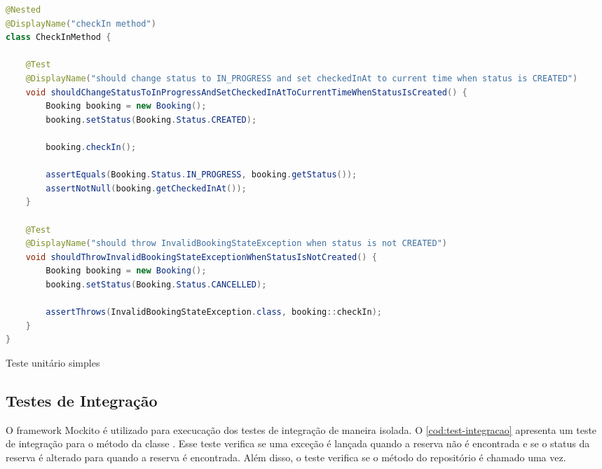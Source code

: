 \begin{codigo}[H]
    \begin{lstlisting}[language=Java]
@Nested
@DisplayName("checkIn method")
class CheckInMethod {

    @Test
    @DisplayName("should change status to IN_PROGRESS and set checkedInAt to current time when status is CREATED")
    void shouldChangeStatusToInProgressAndSetCheckedInAtToCurrentTimeWhenStatusIsCreated() {
        Booking booking = new Booking();
        booking.setStatus(Booking.Status.CREATED);

        booking.checkIn();

        assertEquals(Booking.Status.IN_PROGRESS, booking.getStatus());
        assertNotNull(booking.getCheckedInAt());
    }

    @Test
    @DisplayName("should throw InvalidBookingStateException when status is not CREATED")
    void shouldThrowInvalidBookingStateExceptionWhenStatusIsNotCreated() {
        Booking booking = new Booking();
        booking.setStatus(Booking.Status.CANCELLED);

        assertThrows(InvalidBookingStateException.class, booking::checkIn);
    }
}
    \end{lstlisting}
    \caption{Teste unitário simples}
    \label{cod:unitario-simples}
\end{codigo}

\subsection{Testes de Integração}
O framework Mockito é utilizado para execucação dos testes de integração de maneira isolada. O \autoref{cod:test-integracao} apresenta um teste de integração para o método  da classe . Esse teste verifica se uma exceção é lançada quando a reserva não é encontrada e se o status da reserva é alterado para  quando a reserva é encontrada. Além disso, o teste verifica se o método  do repositório é chamado uma vez.

